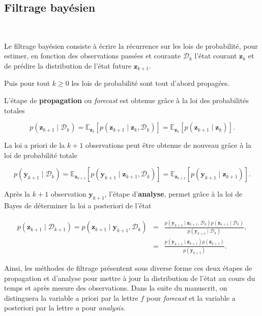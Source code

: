 \subsection{Filtrage bayésien}~\label{filtrage_bayesien}

Le filtrage bayésien consiste à écrire la récurrence sur les lois de probabilité, pour estimer, en fonction des observations passées et courante $\mathcal D_k$ l'état courant $\bm z_k$ et de prédire la distribution de l'état future $\bm z_{k+1}$.

Puis pour tout $k \geq 0$ les lois de probabilité sont tout d'abord propagées.

L'étape de \textbf{propagation} ou \textit{forecast} est obtenue grâce à la loi des probabilités totales

\begin{equation*}
    p(\bm z_{k+1} \mid \mathcal D_k) = \mathbb{E}_{\bm z_k}\left[p(\bm z_{k+1} \mid  \bm z_k,\mathcal{D}_k) \right] = \mathbb{E}_{\bm z_k}\left[p(\bm z_{k+1} \mid \bm z_k)\right].
\end{equation*}

La loi a priori de la $k+1$ observations peut être obtenue de nouveau grâce à la loi de probabilité totale

\begin{equation*}
    p(\bm y_{k+1} \mid \mathcal D_k) = \mathbb{E}_{\bm{z}_{k+1}}\left[p(\bm y_{k+1}\mid \bm z_{k+1},\mathcal D_k)\right] = \mathbb{E}_{\bm{z}_{k+1}}\left[p(\bm y_{k+1}\mid \bm z_{k+1})\right].
\end{equation*}

Après la $k+1$ observation $\bm y_{k+1}$, l'étape d'\textbf{analyse}, permet grâce à la loi de Bayes de déterminer la loi a posteriori de l'état

\begin{eqnarray*}
    p(\bm z_{k+1} \mid \mathcal D_{k+1}) = p(\bm z_{k+1} \mid \bm y_{k+1}, \mathcal D_{k})  &=& \frac{p(\bm y_{k+1} \mid \bm z_{k+1} ,\mathcal D_k)  p(\bm z_{k+1}\mid \mathcal D_k)}{p(\bm y_{k+1}\mid \mathcal D_k)}, \\
    &=& \frac{p(\bm y_{k+1} \mid \bm z_{k+1})  p(\bm z_{k+1})}{p(\bm y_{k+1})}.
\end{eqnarray*}

Ainsi, les méthodes de filtrage présentent sous diverse forme ces deux étapes de propagation et d'analyse pour mettre à jour la distribution de l'état au cours du temps et après mesure des observations. Dans la suite du manuscrit, on distinguera la variable a priori par la lettre $f$ pour \textit{forecast} et la variable a posteriori par la lettre $a$ pour \textit{analysis}.

